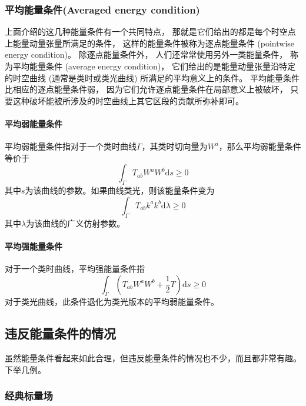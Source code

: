 \documentclass[hyperref, UTF8, a4paper]{ctexart}
\begin{document}
\subsubsection{平均能量条件(Averaged energy condition)}

上面介绍的这几种能量条件有一个共同特点， 那就是它们给出的都是每个时空点上能量动量张量所满足的条件， 这样的能量条件被称为逐点能量条件 (pointwise energy condition)。 除逐点能量条件外， 人们还常常使用另外一类能量条件， 称为平均能量条件 (average energy condition)， 它们给出的是能量动量张量沿特定的时空曲线 (通常是类时或类光曲线) 所满足的平均意义上的条件。 平均能量条件比相应的逐点能量条件弱， 因为它们允许逐点能量条件在局部意义上被破坏， 只要这种破坏能被所涉及的时空曲线上其它区段的贡献所弥补即可。 
\paragraph{平均弱能量条件}

平均弱能量条件指对于一个类时曲线$\Gamma $，其类时切向量为$W^{a}$，那么平均弱能量条件等价于
\begin{equation*}
	\int _{\Gamma } T_{ab} W^{a} W^{b}\mathrm{d} s\geq 0
\end{equation*}
其中$s$为该曲线的参数。如果曲线类光，则该能量条件变为
\begin{equation*}
	\int _{\Gamma } T_{ab} k^{a} k^{b}\mathrm{d} \lambda \geq 0
\end{equation*}
其中$\lambda $为该曲线的广义仿射参数。
\paragraph{平均强能量条件}

对于一个类时曲线，平均强能量条件指
\begin{equation*}
	\int _{\Gamma }\left( T_{ab} W^{a} W^{b} +\frac{1}{2} T\right)\mathrm{d} s\geq 0
\end{equation*}
对于类光曲线，此条件退化为类光版本的平均弱能量条件。
\subsection{违反能量条件的情况}

虽然能量条件看起来如此合理，但违反能量条件的情况也不少，而且都非常有趣。下举几例。
\subsubsection{经典标量场}
\end{document}
